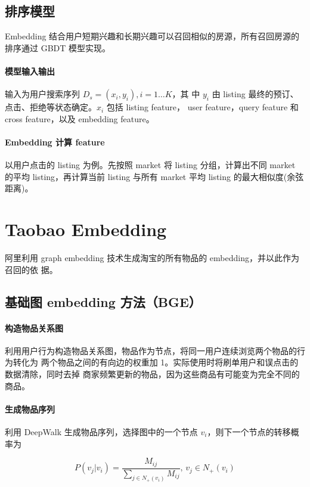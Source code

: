 \subsection{排序模型}
Embedding 结合用户短期兴趣和长期兴趣可以召回相似的房源，所有召回房源的排序通过
GBDT 模型实现。

\paragraph{模型输入输出} 输入为用户搜索序列 $D_s = (x_i, y_i), i=1 \ldots K$，其
中 $y_i$ 由 listing 最终的预订、点击、拒绝等状态确定。$x_i$ 包括 listing feature，
user feature，query feature 和 cross feature，以及 embedding feature。

\paragraph{Embedding 计算 feature} 以用户点击的 listing 为例。先按照 market 将
listing 分组，计算出不同 market 的平均 listing，再计算当前 listing 与所有 market
平均 listing 的最大相似度(余弦距离)。

\section{Taobao Embedding}
阿里利用 graph embedding 技术生成淘宝的所有物品的 embedding，并以此作为召回的依
据。

\subsection{基础图 embedding 方法（BGE）}

\paragraph{构造物品关系图}
利用用户行为构造物品关系图，物品作为节点，将同一用户连续浏览两个物品的行为转化为
两个物品之间的有向边的权重加 1。实际使用时将刷单用户和误点击的数据清除，同时去掉
商家频繁更新的物品，因为这些商品有可能变为完全不同的商品。

\paragraph{生成物品序列}
利用 DeepWalk 生成物品序列，选择图中的一个节点 $v_i$，则下一个节点的转移概率为

\begin{equation}
  P(v_j | v_i) = \frac{M_{ij}}{\sum_{j \in N_{+}(v_i)} M_{ij}}, \, v_j \in N_{+}(v_i)
\end{equation}

